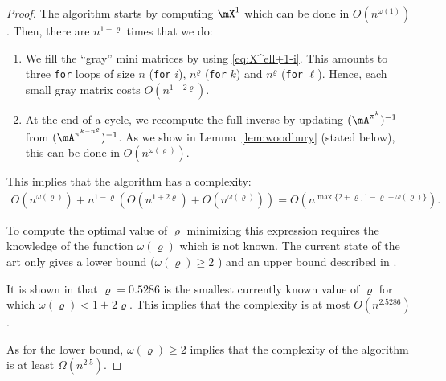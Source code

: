 \begin{proof}
    The algorithm starts by computing $\mX^1$ which can be done in $O( n^{\omega(1)})$. Then, there are $ n^{1-\varrho} $ times that we do:
    \begin{enumerate}
        \item We fill the ``gray'' mini matrices by using \eqref{eq:X^ell+1-i}. This amounts to three \texttt{for} loops of size $n$ (\texttt{for} $i$), $ n^\varrho $ (\texttt{for} $k$) and $ n^\varrho $ (\texttt{for} $\ell$). Hence, each small gray matrix costs $O( n^{1+2\varrho} )$.
        \item At the end of a cycle, we recompute the full inverse by updating $(\mA^{\pi^k})^{-1}$ from $(\mA^{\pi^{k- n^\varrho }})^{-1}$. As we show in Lemma~\ref{lem:woodbury} (stated below), this can be done in $O( n^{\omega(\varrho)} )$.
    \end{enumerate}
This implies that the algorithm has a complexity:
    \begin{align*}
        O( n^{\omega(\varrho)} ) +  n^{1-\varrho}  \left(O( n^{1+2\varrho} )+O( n^{\omega(\varrho)} )\right)  = O( n^{\max\{2+\varrho, 1-\varrho + \omega(\varrho)\}} ).
    \end{align*}
    
    To compute the optimal value of $\varrho$ minimizing this expression requires the knowledge of the function 
    $\omega(\varrho)$ which is  not known. The current state of the art  only gives  a lower bound ($\omega(\varrho) \geq 2$ ) and an upper bound described in  \cite{gall2018improved}.
    
    It is shown in \cite{gall2018improved} that $\varrho=0.5286$ is the smallest currently known value of $\varrho$ for which  $\omega(\varrho)<1+2\varrho$. This implies that the complexity is  at most $O(n^{2.5286})$.
    
    As for the lower bound,  $\omega(\varrho) \geq 2$ implies that the complexity of the
    algorithm is at least  $\Omega(n^{2.5})$.
\end{proof}
  
